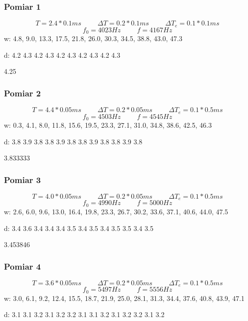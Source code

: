 \documentclass[12pt,a4paper]{article}
\begin{document}
\subsubsection{Pomiar 1}
$$
T = 2.4*0.1ms \hspace{1cm} \Delta T = 0.2*0.1ms \hspace{1cm} \Delta T_e = 0.1*0.1ms 
$$
$$
f_0 = 4023Hz \hspace{1cm} f=4167Hz
$$
w: 4.8, 9.0, 13.3, 17.5, 21.8, 26.0, 30.3, 34.5, 38.8, 43.0, 47.3

d: 4.2 4.3 4.2 4.3 4.2 4.3 4.2 4.3 4.2 4.3

4.25
\subsubsection{Pomiar 2}
$$
T = 4.4*0.05ms \hspace{1cm} \Delta T = 0.2*0.05ms \hspace{1cm} \Delta T_e = 0.1*0.5ms 
$$
$$
f_0 = 4503 Hz \hspace{1cm} f=4545Hz
$$
w: 0.3, 4.1, 8.0, 11.8, 15.6, 19.5, 23.3, 27.1, 31.0, 34.8, 38.6, 42.5, 46.3

d: 3.8 3.9 3.8 3.8 3.9 3.8 3.8 3.9 3.8 3.8 3.9 3.8

3.833333
\subsubsection{Pomiar 3}
$$
T = 4.0*0.05ms \hspace{1cm} \Delta T = 0.2*0.05ms \hspace{1cm} \Delta T_e = 0.1*0.5ms 
$$
$$
f_0 = 4990 Hz \hspace{1cm} f=5000Hz
$$
w: 2.6, 6.0, 9.6, 13.0, 16.4, 19.8, 23.3, 26.7, 30.2, 33.6, 37.1, 40.6, 44.0, 47.5

d: 3.4 3.6 3.4 3.4 3.4 3.5 3.4 3.5 3.4 3.5 3.5 3.4 3.5

3.453846
\subsubsection{Pomiar 4}
$$
T = 3.6*0.05ms \hspace{1cm} \Delta T = 0.2*0.05ms \hspace{1cm} \Delta T_e = 0.1*0.5ms 
$$
$$
f_0 = 5497 Hz \hspace{1cm} f=5556Hz
$$
w: 3.0, 6.1, 9.2, 12.4, 15.5, 18.7, 21.9, 25.0, 28.1, 31.3, 34.4, 37.6, 40.8, 43.9, 47.1

d: 3.1 3.1 3.2 3.1 3.2 3.2 3.1 3.1 3.2 3.1 3.2 3.2 3.1 3.2
\end{document}
